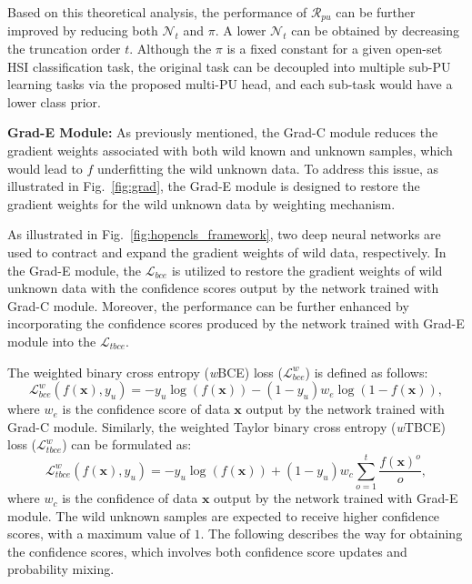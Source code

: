 Based on this theoretical analysis, the performance of $\mathcal{R}_{pu}$ can be further improved by reducing both $\mathcal{N}_{t}$ and ${\pi}$. A lower $\mathcal{N}_{t}$ can be obtained by decreasing the truncation order $t$. Although the $\pi$ is a fixed constant for a given open-set HSI classification task, the original task can be decoupled into multiple sub-PU learning tasks via the proposed multi-PU head, and each sub-task would have a lower class prior.

\noindent \textbf{Grad-E Module:}
As previously mentioned, the Grad-C module reduces the gradient weights associated with both wild known and unknown samples, which would lead to $f$ underfitting the wild unknown data. To address this issue, as illustrated in Fig.~\ref{fig:grad}, the Grad-E module is designed to restore the gradient weights for the wild unknown data by weighting mechanism.

As illustrated in Fig.~\ref{fig:hopencls_framework}, two deep neural networks are used to contract and expand the gradient weights of wild data, respectively. In the Grad-E module, the $\mathcal{L}_{bce}$ is utilized to restore the gradient weights of wild unknown data with the confidence scores output by the network trained with Grad-C module. Moreover, the performance can be further enhanced by incorporating the confidence scores produced by the network trained with Grad-E module into the $\mathcal{L}_{tbce}$.

The weighted binary cross entropy (\textit{w}BCE) loss ($\mathcal{L}_{bce}^{w}$) is defined as follows:
\begin{equation}\nonumber
    \mathcal{L}^{w}_{bce}(f(\boldsymbol{x}),y_{u})=-y_{u}\log(f(\boldsymbol{x}))-(1-y_{u}){w_{e}}\log(1-f(\boldsymbol{x})),
    \label{eq:weight_binary_cross_entropy}
\end{equation}
where $w_{e}$ is the confidence score of data $\boldsymbol{x}$ output by the network trained with Grad-C module.
Similarly, the weighted Taylor binary cross entropy (\textit{w}TBCE) loss ($\mathcal{L}^{w}_{tbce}$) can be formulated as:
\begin{equation}\nonumber
    \mathcal{L}^{w}_{tbce}(f(\boldsymbol{x}),y_{u})=-y_{u}\log(f(\boldsymbol{x}))+(1-y_{u}){w_{c}}\sum_{o=1}^{t}\frac{{f(\boldsymbol{x})}^{o}}{o},
    \label{eq:weight_taylor_binary_cross_entropy}
\end{equation}
where $w_{c}$ is the confidence of data $\boldsymbol{x}$ output by the network trained with Grad-E module. The wild unknown samples are expected to receive higher confidence scores, with a maximum value of $1$. The following describes the way for obtaining the confidence scores, which involves both confidence score updates and probability mixing.

